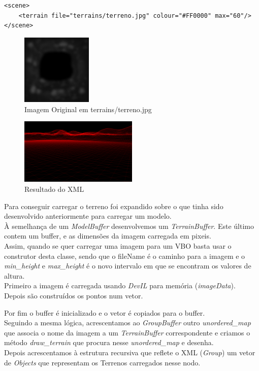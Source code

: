 \documentclass[a4paper]{report}
\begin{document}
\begin{lstlisting}
<scene> 
    <terrain file="terrains/terreno.jpg" colour="#FF0000" max="60"/> 
</scene>
\end{lstlisting}

\begin{figure}[H]
    \centering
    \includegraphics[width=0.3\textwidth]{images/terreno.jpg}
    \caption{Imagem Original em terrains/terreno.jpg}
\end{figure}

\begin{figure}[H]
    \centering
    \includegraphics[width=0.5\textwidth]{images/terrain_rendered.png}
    \caption{Resultado do XML}
\end{figure}
Para conseguir carregar o terreno foi expandido sobre o que tinha sido
desenvolvido anteriormente para carregar um modelo.\\
À semelhança de um \textit{ModelBuffer} desenvolvemos um \textit{TerrainBuffer}.
Este último contem um buffer, e as dimensões da imagem carregada em pixeis.\\
Assim, quando se quer carregar uma imagem para um VBO basta usar o construtor
desta classe, sendo que o fileName é o caminho para a imagem e o
\textit{min\_height} e \textit{max\_height} é o novo intervalo em que se
encontram os valores de altura.\\
Primeiro a imagem é carregada usando \textit{DevIL} para memória
(\textit{imageData}).\\
Depois são construídos os pontos num vetor. 


Por fim o buffer é inicializado e o vetor é copiados para o buffer.\\
Seguindo a mesma lógica, acrescentamos ao \textit{GroupBuffer} outro
\textit{unordered\_map} que associa o nome da imagem a um \textit{TerrainBuffer}
correspondente e criamos o método \textit{draw\_terrain} que procura nesse
\textit{unordered\_map} e desenha.\\
Depois acrescentamos à estrutura recursiva que reflete o XML (\textit{Group}) um
vetor de \textit{Objects} que representam os Terrenos carregados nesse nodo.
\end{document}
